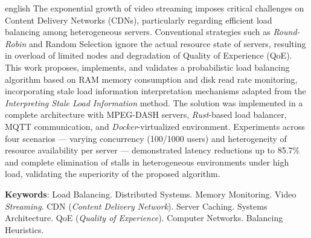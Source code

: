 
\begin{resumo}[Abstract]
 \begin{otherlanguage*}{english}
The exponential growth of video streaming imposes critical challenges on Content Delivery Networks (CDNs), particularly regarding efficient load balancing among heterogeneous servers.
%
Conventional strategies such as \textit{Round-Robin} and Random Selection ignore the actual resource state of servers, resulting in overload of limited nodes and degradation of Quality of Experience (QoE).
%
This work proposes, implements, and validates a probabilistic load balancing algorithm based on RAM memory consumption and disk read rate monitoring, incorporating stale load information interpretation mechanisms adapted from the \textit{Interpreting Stale Load Information} method.
%
The solution was implemented in a complete architecture with MPEG-DASH servers, \textit{Rust}-based load balancer, MQTT communication, and \textit{Docker}-virtualized environment.
%
Experiments across four scenarios — varying concurrency (100/1000 users) and heterogeneity of resource availability per server — demonstrated latency reductions up to 85.7\% and complete elimination of stalls in heterogeneous environments under high load, validating the superiority of the proposed algorithm.

 \textbf{Keywords}:
 Load Balancing.
 Distributed Systems.
 Memory Monitoring.
 Video \textit{Streaming}.
 CDN (\textit{Content Delivery Network}).
 Server Caching.
 Systems Architecture.
 QoE (\textit{Quality of Experience}).
 Computer Networks.
 Balancing Heuristics.
 \end{otherlanguage*}
\end{resumo}
